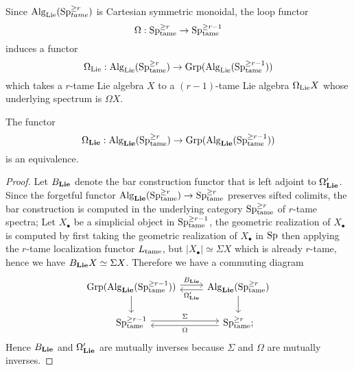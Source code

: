 Since $\operatorname{Alg}_{\operatorname{Lie}}(\operatorname{Sp}^{\geq r}_{tame})$ is Cartesian symmetric monoidal, the loop functor 
$$
\Omega: \operatorname{Sp}^{\geq r}_{\operatorname{\operatorname{tame}}}
\to 
\operatorname{Sp}^{\geq r-1}_{\operatorname{\operatorname{tame}}}
$$
induces a functor
\[
\Omega_{\operatorname{Lie}}:\operatorname{Alg}_{\operatorname{Lie}}(\operatorname{Sp}^{\geq r}_{\operatorname{\operatorname{tame}}}) \to \operatorname{Grp}( \operatorname{Alg}_{\operatorname{Lie}}(\operatorname{Sp}^{\geq r-1}_{\operatorname{\operatorname{tame}}}) )
\]
which takes a $r$-tame Lie algebra $X$ to a $(r-1)$-tame Lie algebra $\Omega_{\operatorname{Lie}}X$ whose underlying spectrum is $\Omega X$.
\begin{proposition}
	\label{B and Omega are mutally inverses}
	The functor 
	\[
	\Omega_{\mathbf{Lie}}: 
	\operatorname{Alg}_{\mathbf{Lie}}(\operatorname{Sp}^{\geq r}_{\operatorname{\operatorname{tame}}}) \to \operatorname{Grp}( \operatorname{Alg}_{\mathbf{Lie}}(\operatorname{Sp}^{\geq r-1}_{\operatorname{\operatorname{tame}}}))
	\]
	is an equivalence.
\end{proposition}
\begin{proof}
	Let $B_{\mathbf{Lie}}$ denote the bar construction functor that is left adjoint to $\Omega_{\mathbf{Lie}}'$. Since the forgetful functor 	
	$\operatorname{Alg}_{\mathbf{Lie}}(\operatorname{Sp}^{\geq r}_{\operatorname{\operatorname{tame}}}) \to \operatorname{Sp}^{\geq r}_{\operatorname{\operatorname{tame}}}$ preserves sifted colimits, the bar construction is computed in the underlying category $\operatorname{Sp}^{\geq r}_{\operatorname{\operatorname{tame}}}$ of $r$-tame spectra;
	Let $X_{\bullet}$ be a simplicial object in $\operatorname{Sp}^{\geq r-1}_{\operatorname{\operatorname{tame}}}$, the geometric realization of $X_{\bullet}$ is computed by first taking the geometric realization of $X_{\bullet}$ in $\operatorname{Sp}$ then applying the $r$-tame localization functor $L_{\operatorname{\operatorname{tame}}}$, but $|X_{\bullet}|\simeq \Sigma X$ which is already $r$-tame, hence we have $B_{\mathbf{Lie}}X\simeq \Sigma X$.
	Therefore we have a commuting diagram
	\[
	\begin{tikzcd}
		\Grp( \Alg_{\spLie}(\Sp^{\geq r-1}_{\tame}) ) & \Alg_{\spLie}(\Sp^{\geq r}_{\tame})\\
		\Sp^{\geq r-1}_{\tame} &
		\Sp^{\geq r}_{\tame};
		\arrow[from=1-1, to=1-2, "B_{\spLie}", shift left]
		\arrow[from=1-2, to=1-1, "\Omega_{\spLie}'", shift left]
		\arrow[from=1-1, to=2-1]
		\arrow[from=1-2, to=2-2]
		\arrow[from=2-1, to=2-2, "\Sigma", shift left]
		\arrow[from=2-2, to=2-1, "\Omega", shift left]
	\end{tikzcd}
	\]
	Hence $B_{\mathbf{Lie}}$ and $\Omega_{\mathbf{Lie}}'$ are mutually inverses because $\Sigma$ and $\Omega$ are mutually inverses.
\end{proof}

%	
%

